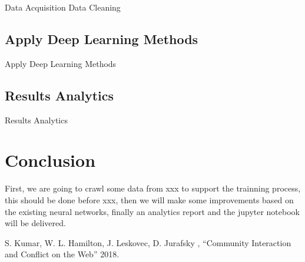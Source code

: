 \documentclass[conference]{IEEEtran}
\begin{document}
Data Acquisition Data Cleaning

\subsection{Apply Deep Learning Methods}

Apply Deep Learning Methods

\subsection{Results Analytics}

Results Analytics

\section{Conclusion}

First, we are going to crawl some data from {xxx} to support the trainning process, this should be done before {xxx}, then we will make some improvements based on the existing neural networks, finally an analytics report and the jupyter notebook will be delivered.

\begin{thebibliography}{00}
  
   S. Kumar, W. L. Hamilton, J. Leskovec, D. Jurafsky , ``Community Interaction and Conflict on the Web'' 2018.
  
\end{thebibliography}
\end{document}
